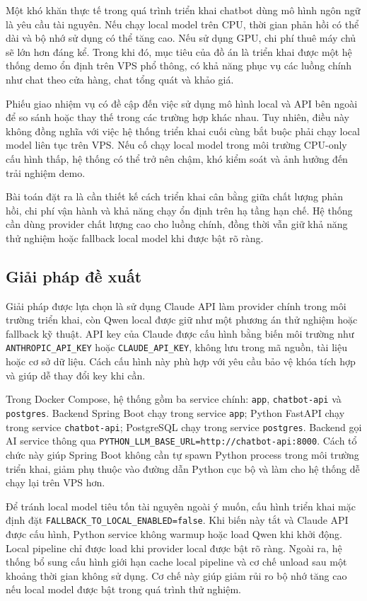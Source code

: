 \documentclass[../DoAn.tex]{subfiles}
\begin{document}
Một khó khăn thực tế trong quá trình triển khai chatbot dùng mô hình ngôn ngữ là yêu cầu tài nguyên. Nếu chạy local model trên CPU, thời gian phản hồi có thể dài và bộ nhớ sử dụng có thể tăng cao. Nếu sử dụng GPU, chi phí thuê máy chủ sẽ lớn hơn đáng kể. Trong khi đó, mục tiêu của đồ án là triển khai được một hệ thống demo ổn định trên VPS phổ thông, có khả năng phục vụ các luồng chính như chat theo cửa hàng, chat tổng quát và khảo giá.

Phiếu giao nhiệm vụ có đề cập đến việc sử dụng mô hình local và API bên ngoài để so sánh hoặc thay thế trong các trường hợp khác nhau. Tuy nhiên, điều này không đồng nghĩa với việc hệ thống triển khai cuối cùng bắt buộc phải chạy local model liên tục trên VPS. Nếu cố chạy local model trong môi trường CPU-only cấu hình thấp, hệ thống có thể trở nên chậm, khó kiểm soát và ảnh hưởng đến trải nghiệm demo.

Bài toán đặt ra là cần thiết kế cách triển khai cân bằng giữa chất lượng phản hồi, chi phí vận hành và khả năng chạy ổn định trên hạ tầng hạn chế. Hệ thống cần dùng provider chất lượng cao cho luồng chính, đồng thời vẫn giữ khả năng thử nghiệm hoặc fallback local model khi được bật rõ ràng.

\subsection{Giải pháp đề xuất}
\label{subsection:5.5.2}

Giải pháp được lựa chọn là sử dụng Claude API làm provider chính trong môi trường triển khai, còn Qwen local được giữ như một phương án thử nghiệm hoặc fallback kỹ thuật. API key của Claude được cấu hình bằng biến môi trường như \texttt{ANTHROPIC\_API\_KEY} hoặc \texttt{CLAUDE\_API\_KEY}, không lưu trong mã nguồn, tài liệu hoặc cơ sở dữ liệu. Cách cấu hình này phù hợp với yêu cầu bảo vệ khóa tích hợp và giúp dễ thay đổi key khi cần.

Trong Docker Compose, hệ thống gồm ba service chính: \texttt{app}, \texttt{chatbot-api} và \texttt{postgres}. Backend Spring Boot chạy trong service \texttt{app}; Python FastAPI chạy trong service \texttt{chatbot-api}; PostgreSQL chạy trong service \texttt{postgres}. Backend gọi AI service thông qua \texttt{PYTHON\_LLM\_BASE\_URL=http://chatbot-api:8000}. Cách tổ chức này giúp Spring Boot không cần tự spawn Python process trong môi trường triển khai, giảm phụ thuộc vào đường dẫn Python cục bộ và làm cho hệ thống dễ chạy lại trên VPS hơn.

Để tránh local model tiêu tốn tài nguyên ngoài ý muốn, cấu hình triển khai mặc định đặt \texttt{FALLBACK\_TO\_LOCAL\_ENABLED=false}. Khi biến này tắt và Claude API được cấu hình, Python service không warmup hoặc load Qwen khi khởi động. Local pipeline chỉ được load khi provider local được bật rõ ràng. Ngoài ra, hệ thống bổ sung cấu hình giới hạn cache local pipeline và cơ chế unload sau một khoảng thời gian không sử dụng. Cơ chế này giúp giảm rủi ro bộ nhớ tăng cao nếu local model được bật trong quá trình thử nghiệm.
\end{document}
